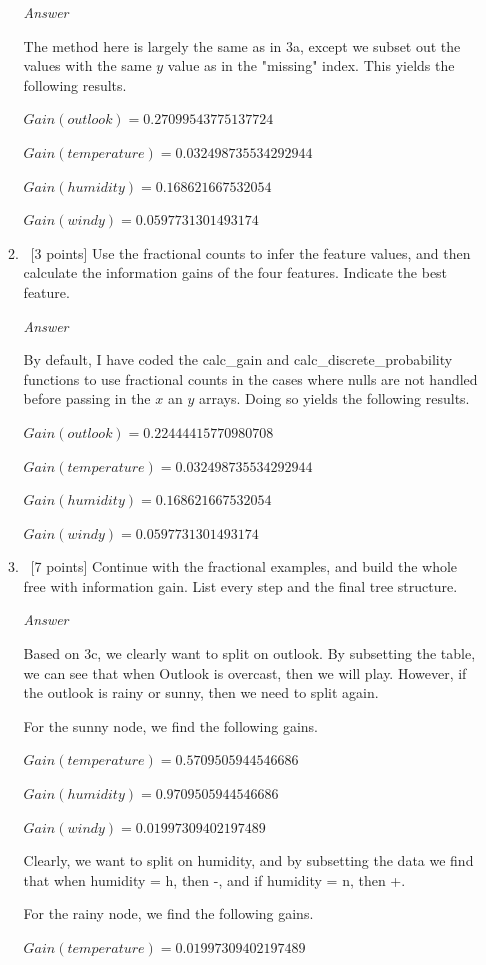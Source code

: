 \documentclass[12pt, fullpage,letterpaper]{article}
\begin{document}
\begin{enumerate}
\begin{enumerate}
\emph{Answer}

The method here is largely the same as in 3a, except we subset out the values with the same $y$ value as in the "missing" index. This yields the following results.

$Gain(outlook)=0.27099543775137724$

$Gain(temperature)=0.032498735534292944$

$Gain(humidity)=0.168621667532054$

$Gain(windy)=0.0597731301493174$

\item~[3 points] Use the fractional counts to infer the feature values, and then calculate the information gains of the four features. Indicate the best feature.

\emph{Answer}

By default, I have coded the calc\_gain and calc\_discrete\_probability functions to use fractional counts in the cases where nulls are not handled before passing in the $x$ an $y$ arrays. Doing so yields the following results.

$Gain(outlook)=0.22444415770980708$

$Gain(temperature)=0.032498735534292944$

$Gain(humidity)=0.168621667532054$

$Gain(windy)=0.0597731301493174$

\item~[7 points] Continue with the fractional examples, and build the whole free with information gain. List every step and the final tree structure.

\emph{Answer}

Based on 3c, we clearly want to split on outlook. By subsetting the table, we can see that when Outlook is overcast, then we will play. However, if the outlook is rainy or sunny, then we need to split again.

For the sunny node, we find the following gains.

$Gain(temperature)=0.5709505944546686$

$Gain(humidity)=0.9709505944546686$

$Gain(windy)=0.01997309402197489$

Clearly, we want to split on humidity, and by subsetting the data we find that when humidity = h, then -, and if humidity = n, then +.

For the rainy node, we find the following gains.

$Gain(temperature)=0.01997309402197489$


\end{enumerate}
\end{enumerate}
\end{document}

